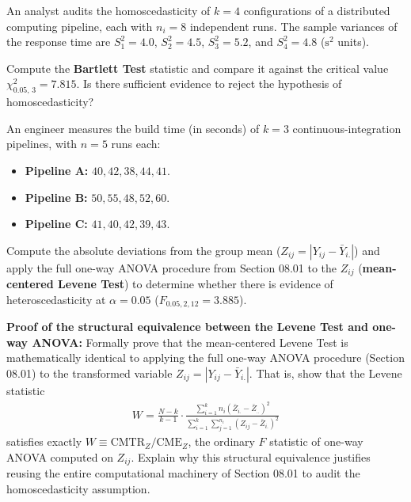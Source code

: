 \begin{problema}
	\label{prob:bartlett_pipelines_ci}
	An analyst audits the homoscedasticity of $k = 4$ configurations of a distributed computing pipeline, each with $n_i = 8$ independent runs. The sample variances of the response time are $S_1^2 = 4.0$, $S_2^2 = 4.5$, $S_3^2 = 5.2$, and $S_4^2 = 4.8$ ($\text{s}^2$ units).

	Compute the \textbf{Bartlett Test} statistic and compare it against the critical value $\chi^2_{0.05, \, 3} = 7.815$. Is there sufficient evidence to reject the hypothesis of homoscedasticity?
\end{problema}

\begin{problema}
	\label{prob:levene_pipelines_cicd}
	An engineer measures the build time (in seconds) of $k = 3$ continuous-integration pipelines, with $n = 5$ runs each:
	\begin{itemize}
		\item \textbf{Pipeline A:} $40, 42, 38, 44, 41$.
		\item \textbf{Pipeline B:} $50, 55, 48, 52, 60$.
		\item \textbf{Pipeline C:} $41, 40, 42, 39, 43$.
	\end{itemize}
	Compute the absolute deviations from the group mean ($Z_{ij} = |Y_{ij} - \bar{Y}_{i.}|$) and apply the full one-way ANOVA procedure from Section 08.01 to the $Z_{ij}$ (\textbf{mean-centered Levene Test}) to determine whether there is evidence of heteroscedasticity at $\alpha = 0.05$ ($F_{0.05, 2, 12} = 3.885$).
\end{problema}

\begin{problema}
	\label{prob:levene_como_anova_demo}
	\textbf{Proof of the structural equivalence between the Levene Test and one-way ANOVA:}
	Formally prove that the mean-centered Levene Test is mathematically identical to applying the full one-way ANOVA procedure (Section 08.01) to the transformed variable $Z_{ij} = |Y_{ij} - \bar{Y}_{i.}|$. That is, show that the Levene statistic
	\begin{align}
		W = \frac{N-k}{k-1} \cdot \frac{\sum_{i=1}^k n_i (\bar{Z}_{i.} - \bar{Z}_{..})^2}{\sum_{i=1}^k \sum_{j=1}^{n_i} (Z_{ij} - \bar{Z}_{i.})^2}
	\end{align}
	satisfies exactly $W \equiv \text{CMTR}_Z / \text{CME}_Z$, the ordinary $F$ statistic of one-way ANOVA computed on $Z_{ij}$. Explain why this structural equivalence justifies reusing the entire computational machinery of Section 08.01 to audit the homoscedasticity assumption.
\end{problema}

